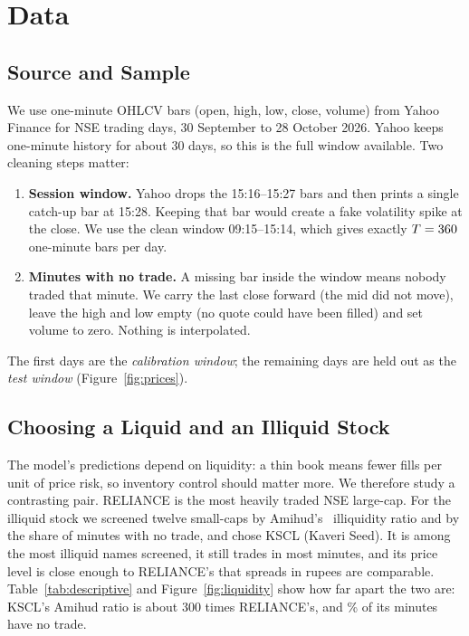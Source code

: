 \section{Data}
\label{sec:data}

\subsection{Source and Sample}

We use one-minute OHLCV bars (open, high, low, close, volume) from Yahoo Finance for
\RELIANCEDays{} NSE trading days, 30 September to 28 October 2026. Yahoo keeps one-minute
history for about 30 days, so this is the full window available. Two cleaning steps matter:
\begin{enumerate}
\item \textbf{Session window.} Yahoo drops the 15:16--15:27 bars and then prints a single
  catch-up bar at 15:28. Keeping that bar would create a fake volatility spike at the close.
  We use the clean window 09:15--15:14, which gives exactly $T=360$ one-minute bars per day.
\item \textbf{Minutes with no trade.} A missing bar inside the window means nobody traded that
  minute. We carry the last close forward (the mid did not move), leave the high and low empty
  (no quote could have been filled) and set volume to zero. Nothing is interpolated.
\end{enumerate}
The first \CalibDays{} days are the \emph{calibration window}; the remaining
\RELIANCETestDays{} days are held out as the \emph{test window} (Figure~\ref{fig:prices}).

\subsection{Choosing a Liquid and an Illiquid Stock}

The model's predictions depend on liquidity: a thin book means fewer fills per unit of price risk,
so inventory control should matter more. We therefore study a contrasting pair. RELIANCE is the
most heavily traded NSE large-cap. For the illiquid stock we screened twelve small-caps by
Amihud's~\cite{amihud2002} illiquidity ratio and by the share of minutes with no trade, and chose
KSCL (Kaveri Seed). It is among the most illiquid names screened, it still trades in most
minutes, and its price level is close enough to RELIANCE's that spreads in rupees are comparable.
Table~\ref{tab:descriptive} and Figure~\ref{fig:liquidity} show how far apart the two are: KSCL's
Amihud ratio is about 300 times RELIANCE's, and \KSCLNoTrade\% of its minutes have no trade.

